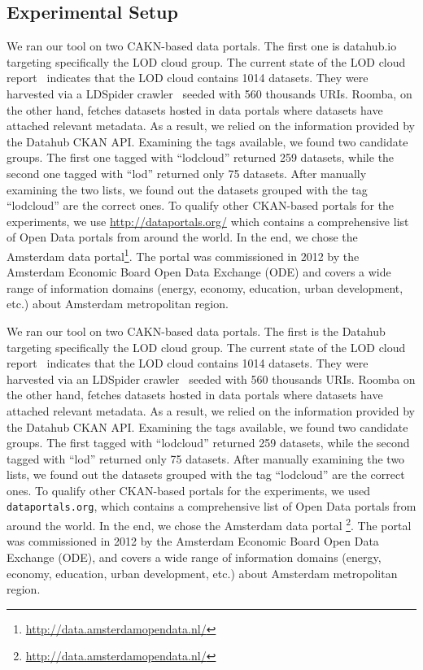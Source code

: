 \documentclass[runningheads,a4paper]{../../Util/LaTEX/llncs}
\begin{document}
\subsection{Experimental Setup}
We ran our tool on two CAKN-based data portals. The first one is datahub.io targeting specifically the LOD cloud group. The current state of the LOD cloud report~\cite{Schmachtenberg:ISWC:14} indicates that the LOD cloud contains 1014 datasets. They were harvested via a LDSpider crawler~\cite{Isele:ISWC:10} seeded with 560 thousands URIs. Roomba, on the other hand, fetches datasets hosted in data portals where datasets have attached relevant metadata. As a result, we relied on the information provided by the Datahub CKAN API. Examining the tags available, we found two candidate groups. The first one tagged with ``lodcloud'' returned 259 datasets, while the second one tagged with ``lod'' returned only 75 datasets. After manually examining the two lists, we found out the datasets grouped with the tag ``lodcloud'' are the correct ones. To qualify other CKAN-based portals for the experiments, we use \url{http://dataportals.org/} which contains a comprehensive list of Open Data portals from around the world. In the end, we chose the Amsterdam data portal\footnote{\url{http://data.amsterdamopendata.nl/}}. The portal was commissioned in 2012 by the Amsterdam Economic Board Open Data Exchange (ODE) and covers a wide range of information domains (energy, economy, education, urban development, etc.) about Amsterdam metropolitan region.

We ran our tool on two CAKN-based data portals. The first is the Datahub targeting specifically the LOD cloud group. The current state of the LOD cloud report~\cite{Schmachtenberg:ISWC:14} indicates that the LOD cloud contains 1014 datasets. They were harvested via an LDSpider crawler~\cite{Isele:ISWC:10} seeded with 560 thousands URIs. Roomba on the other hand, fetches datasets hosted in data portals where datasets have attached relevant metadata. As a result, we relied on the information provided by the Datahub CKAN API. Examining the tags available, we found two candidate groups. The first tagged with ``lodcloud'' returned 259 datasets, while the second tagged with ``lod'' returned only 75 datasets. After manually examining the two lists, we found out the datasets grouped with the tag ``lodcloud'' are the correct ones. To qualify other CKAN-based portals for the experiments, we used \texttt{dataportals.org}, which contains a comprehensive list of Open Data portals from around the world. In the end, we chose the Amsterdam data portal \footnote{\url{http://data.amsterdamopendata.nl/}}. The portal was commissioned in 2012 by the Amsterdam Economic Board Open Data Exchange (ODE), and covers a wide range of information domains (energy, economy, education, urban development, etc.) about Amsterdam metropolitan region.
\end{document}
